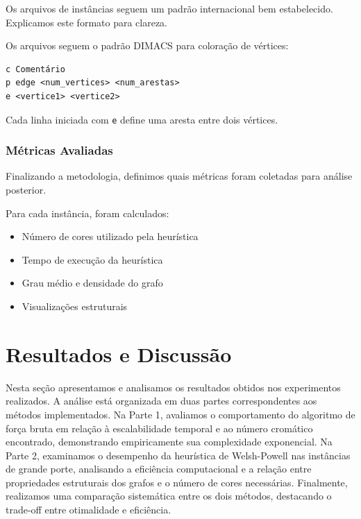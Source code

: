 \documentclass[12pt]{article}
\begin{document}
Os arquivos de instâncias seguem um padrão internacional bem estabelecido. Explicamos este formato para clareza.

Os arquivos seguem o padrão DIMACS para coloração de vértices:

\begin{verbatim}
c Comentário
p edge <num_vertices> <num_arestas>
e <vertice1> <vertice2>
\end{verbatim}

Cada linha iniciada com \texttt{e} define uma aresta entre dois vértices.

\subsubsection{Métricas Avaliadas}

Finalizando a metodologia, definimos quais métricas foram coletadas para análise posterior.

Para cada instância, foram calculados:

\begin{itemize}
    \item Número de cores utilizado pela heurística
    \item Tempo de execução da heurística
    \item Grau médio e densidade do grafo
    \item Visualizações estruturais
\end{itemize}

\newpage
\section{Resultados e Discussão}

Nesta seção apresentamos e analisamos os resultados obtidos nos experimentos realizados. A análise está organizada em duas partes correspondentes aos métodos implementados. Na Parte 1, avaliamos o comportamento do algoritmo de força bruta em relação à escalabilidade temporal e ao número cromático encontrado, demonstrando empiricamente sua complexidade exponencial. Na Parte 2, examinamos o desempenho da heurística de Welsh-Powell nas instâncias de grande porte, analisando a eficiência computacional e a relação entre propriedades estruturais dos grafos e o número de cores necessárias. Finalmente, realizamos uma comparação sistemática entre os dois métodos, destacando o trade-off entre otimalidade e eficiência.
\end{document}
